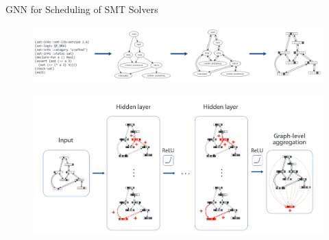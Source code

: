 \documentclass[14pt,aspectratio=169,hyperref={pdftex,unicode},xcolor=dvipsnames]{beamer}
\begin{document}
\begin{frame}[noframenumbering]{GNN for Scheduling of SMT Solvers \cite{gnn-for-scheduling-paper}}

\begin{center}

\begin{figure}[ht]
\begin{center}
  \includegraphics[scale=0.175]{./assets/gnn-for-scheduling-architecture.png}
\end{center}
\end{figure}

\begin{figure}[ht]
\begin{center}
  \includegraphics[scale=0.14]{./assets/gnn-for-scheduling-process.png}
\end{center}
\end{figure}

\end{center}

\end{frame}
\end{document}

